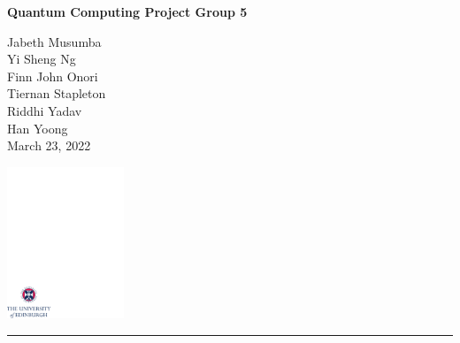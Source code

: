 \documentclass{article}
\begin{document}
\onehalfspacing
\parindent=0pt          %


\thispagestyle{empty}

\vspace*{0.1\textheight}

\begin{center}
        \huge{\bfseries Quantum Computing Project Group 5}\\
\end{center}

\bigskip

\begin{center}
        \large{Jabeth Musumba}\\
        \large{Yi Sheng Ng}\\
        \large{Finn John Onori}\\
        \large{Tiernan Stapleton}\\
        \large{Riddhi Yadav}\\
        \large{Han Yoong}\\
        \bigskip
        \large{March 23, 2022}
\end{center}

\vspace*{0.4\textheight}

\begin{center}
        \includegraphics[width=35mm]{crest.pdf}
\end{center}

\medskip

\newpage

\vspace{10mm}
\hrule
\end{document}
